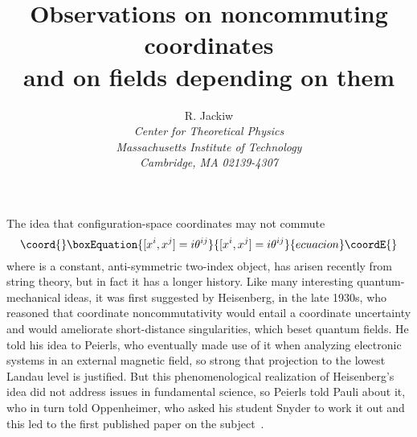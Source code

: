 \documentclass[a4paper,12pt,twoside]{article}
\providecommand{\numeq}[2]{\begin{equation}\coord{}\boxEquation{
#2
\label{#1}
}{
#2
}{ecuacion}\coordE{}\end{equation}}
\begin{document}
 
\title{Observations on noncommuting coordinates\\ and on fields depending on them}
\author{R. Jackiw\\
\small\it Center for Theoretical Physics\\ 
\small\it Massachusetts Institute of Technology\\ 
\small\it Cambridge, MA 02139-4307}

\date{\vspace*{-.25in}}

\maketitle




\pagestyle{myheadings}
\thispagestyle{empty}


\section*{}


The idea that configuration-space coordinates may not commute
\numeq{e1}{
[x^i, x^j] = i\theta^{ij}
}
where \coordHE{} is a constant, anti-symmetric two-index object, has arisen recently from
string theory, but in fact it has a longer history.  Like many interesting quantum-mechanical
ideas, it was first suggested  by Heisenberg, in the late 1930s, who reasoned that coordinate
noncommutativity would entail a coordinate uncertainty and would ameliorate short-distance
singularities, which beset quantum fields. He told  his idea to Peierls, who eventually made use
of it when analyzing electronic systems in an external magnetic field, so strong that projection
to the lowest Landau level is justified.   But this phenomenological realization of
Heisenberg's idea did not address  issues in fundamental science, so Peierls told Pauli about
it, who in turn told Oppenheimer, who  asked his student Snyder to work it out and this  led to
the first published paper on the subject~\cite{r1}. 
\end{document}
